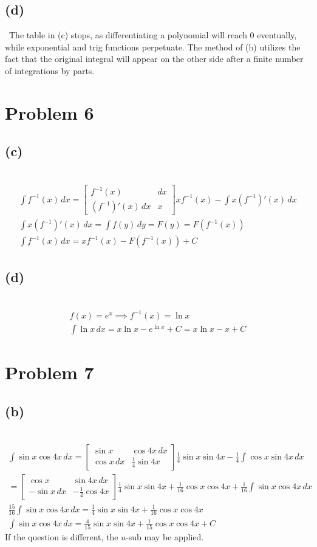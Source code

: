 \documentclass[12pt]{article}
\newcommand{\vem}{\vspace{0.5em}}
\newcommand{\problem}[1]{\section{Problem #1}}
\newcommand{\subproblem}[1]{\subsection{(#1)} \,}
\begin{document}
\subproblem{d}
The table in (c) stops, as differentiating a polynomial will reach 0 eventually, while exponential and trig functions perpetuate. The method of (b) utilizes the fact that the original integral will appear on the other side after a finite number of integrations by parts. 

\problem{6}

\subproblem{c}
\begin{gather*}
    \int f^{-1}(x)\, dx =  
    \begin{bmatrix}
        f^{-1}(x) & dx \\
        (f^{-1})'(x)\, dx & x 
    \end{bmatrix}
    xf^{-1}(x) - \int x(f^{-1})'(x)\, dx\\
    \int x(f^{-1})'(x)\, dx = \int f(y)\, dy = F(y)=F(f^{-1}(x))\\
    \int f^{-1}(x)\, dx =  \boxed{xf^{-1}(x) - F(f^{-1}(x)) +C}
\end{gather*}

\subproblem{d}
\begin{gather*}
    f(x)=e^x \implies f^{-1}(x)=\ln x\\
    \int \ln x \, dx = x \ln x - e^{\ln x } +C= \boxed{x\ln x -x+C}
\end{gather*}

\problem{7}

\subproblem{b}
\begin{gather*}
    \int \sin x \cos 4x \, dx=
    \begin{bmatrix}
        \sin x & \cos 4 x\, dx\\
        \cos x \, dx& \frac{1}{4}\sin 4x
    \end{bmatrix}
    \frac{1}{4}\sin x \sin 4x-\frac{1}{4}\int \cos x \sin 4 x\, dx\\
    =\begin{bmatrix}
        \cos x & \sin 4 x\, dx\\
        -\sin x \, dx & -\frac{1}{4}\cos 4x
    \end{bmatrix}
    \frac{1}{4}\sin x \sin 4x + \frac{1}{16}\cos x \cos 4x + \frac{1}{16}\int \sin x \cos 4x\, dx\\
    \frac{15}{16}\int \sin x \cos 4x\, dx = \frac{1}{4}\sin x \sin 4x + \frac{1}{16}\cos x \cos 4x\\
    \int \sin x \cos 4x\, dx  = \boxed{\frac{4}{15}\sin x \sin 4x + \frac{1}{15}\cos x \cos 4x+C}
\end{gather*}
If the question is different, the $u$-sub may be applied. \vem
\end{document}
